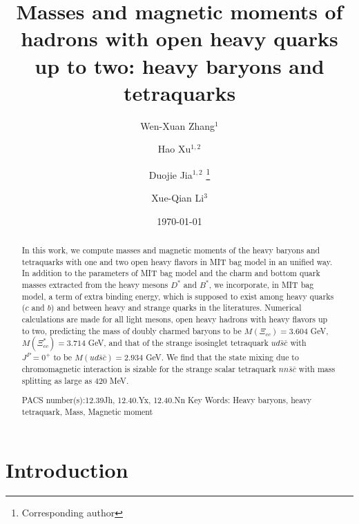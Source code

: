 \documentclass[12pt,onecolumn,floatfix,nofootinbib]{revtex4}
\begin{document}
\title{Masses and magnetic moments of hadrons with open heavy quarks up to
two: heavy baryons and tetraquarks}
\author{Wen-Xuan Zhang$^{1}$}
\author{Hao Xu$^{1,2}$}
\author{Duojie Jia$^{1,2}$ \thanks{%
Corresponding author}}
\author{Xue-Qian Li$^{3}$}

\begin{abstract}
In this work, we compute masses and magnetic moments of the heavy baryons
and tetraquarks with one and two open heavy flavors in MIT bag model in an
unified way. In addition to the parameters of MIT bag model and the charm
and bottom quark masses extracted from the heavy mesons $D^{\ast }$ and $%
B^{\ast }$, we incorporate, in MIT bag model, a term of extra binding
energy, which is supposed to exist among heavy quarks ($c$ and $b$) and
between heavy and strange quarks in the literatures. Numerical calculations
are made for all light mesons, open heavy hadrons with heavy flavors up to
two, predicting the mass of doubly charmed baryons to be $M(\Xi _{cc})=3.604$
GeV, $M(\Xi _{cc}^{\ast })=3.714$ GeV, and that of the strange isosinglet
tetraquark $ud\bar{s}\bar{c}$ with $J^{P}=0^{+}$ to be $M\left( ud\bar{s}%
\bar{c}\right) =2.934$ GeV. We find that the state mixing due to
chromomagnetic interaction is sizable for the strange scalar tetraquark $nn%
\bar{s}\bar{c}$ with mass splitting as large as $420$ MeV.

{\normalsize PACS number(s):12.39Jh, 12.40.Yx, 12.40.Nn} {\normalsize Key
Words: Heavy baryons, heavy tetraquark, Mass, Magnetic moment}
\end{abstract}

\maketitle
\date{\today }


\section{Introduction}
\end{document}
